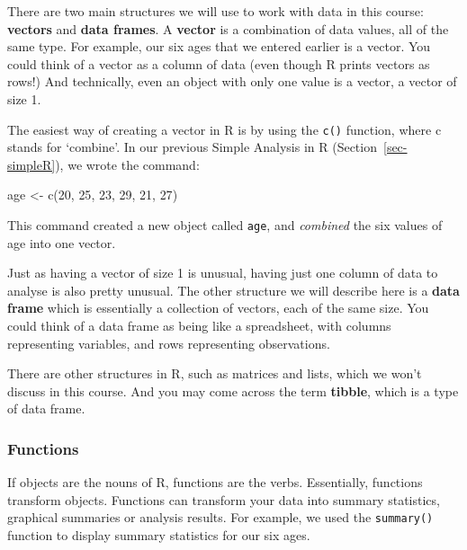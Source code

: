 \documentclass[
  a4paper,
]{memoir}
\newenvironment{Shaded}{\begin{snugshade}}{\end{snugshade}}
\newcommand{\DecValTok}[1]{\textcolor[rgb]{0.00,0.00,0.00}{#1}}
\newcommand{\FunctionTok}[1]{\textcolor[rgb]{0.00,0.00,0.00}{#1}}
\newcommand{\NormalTok}[1]{\textcolor[rgb]{0.00,0.00,0.00}{#1}}
\newcommand{\OtherTok}[1]{\textcolor[rgb]{0.00,0.00,0.00}{#1}}
\begin{document}
There are two main structures we will use to work with data in this
course: \textbf{vectors} and \textbf{data frames}. A \textbf{vector} is
a combination of data values, all of the same type. For example, our six
ages that we entered earlier is a vector. You could think of a vector as
a column of data (even though R prints vectors as rows!) And
technically, even an object with only one value is a vector, a vector of
size 1.

The easiest way of creating a vector in R is by using the \texttt{c()}
function, where c stands for `combine'. In our previous Simple Analysis
in R (Section~\ref{sec-simpleR}), we wrote the command:

\begin{Shaded}
\begin{Highlighting}[]
\NormalTok{age }\OtherTok{\textless{}{-}} \FunctionTok{c}\NormalTok{(}\DecValTok{20}\NormalTok{, }\DecValTok{25}\NormalTok{, }\DecValTok{23}\NormalTok{, }\DecValTok{29}\NormalTok{, }\DecValTok{21}\NormalTok{, }\DecValTok{27}\NormalTok{)}
\end{Highlighting}
\end{Shaded}

This command created a new object called \texttt{age}, and
\emph{combined} the six values of age into one vector.

Just as having a vector of size 1 is unusual, having just one column of
data to analyse is also pretty unusual. The other structure we will
describe here is a \textbf{data frame} which is essentially a collection
of vectors, each of the same size. You could think of a data frame as
being like a spreadsheet, with columns representing variables, and rows
representing observations.

There are other structures in R, such as matrices and lists, which we
won't discuss in this course. And you may come across the term
\textbf{tibble}, which is a type of data frame.

\hypertarget{functions}{%
\subsubsection{Functions}\label{functions}}

If objects are the nouns of R, functions are the verbs. Essentially,
functions transform objects. Functions can transform your data into
summary statistics, graphical summaries or analysis results. For
example, we used the \texttt{summary()} function to display summary
statistics for our six ages.
\end{document}
